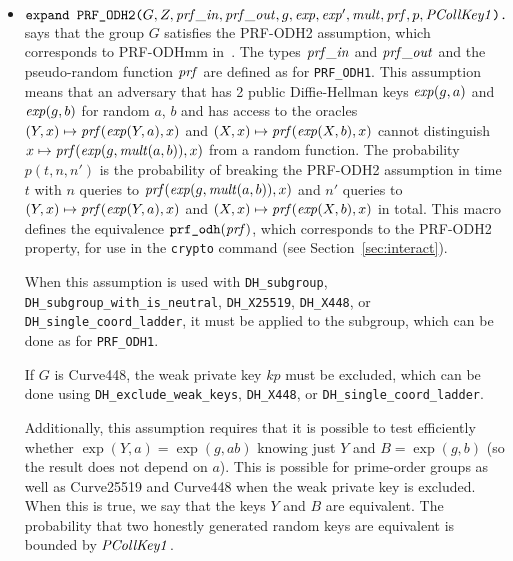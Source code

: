 \documentclass{article}
\begin{document}
\begin{itemize}
\begin{itemize}
\begin{itemize}
       \item $\texttt{expand\ PRF\_ODH2(}G, Z, \mathit{prf\_in}, \mathit{prf\_out}, g, \mathit{exp}, \mathit{exp}', \mathit{mult}, \mathit{prf}, p, \mathit{PCollKey1}\texttt{).}$ says that the group $G$ satisfies the PRF-ODH2 assumption, which corresponds to PRF-ODHmm in~\cite{eprint2017:517}.
       The types $\mathit{prf\_in}$ and $\mathit{prf\_out}$ and the pseudo-random function $\mathit{prf}$ are defined as for \texttt{PRF\_ODH1}.
       This assumption means that an adversary that has 2 public Diffie-Hellman keys $\mathit{exp}(g,a)$ and $\mathit{exp}(g,b)$ for random $a$, $b$ and has access to the oracles $(Y,x) \mapsto \mathit{prf}(\mathit{exp}(Y,a),x)$ and $(X,x) \mapsto \mathit{prf}(\mathit{exp}(X,b),x)$ cannot distinguish $x \mapsto \mathit{prf}(\mathit{exp}(g,\mathit{mult}(a,b)),x)$ from a random function.
The probability $p(t, n, n')$ is the probability of breaking the PRF-ODH2 assumption
   in time $t$ with $n$ queries to $\mathit{prf}(\mathit{exp}(g,\mathit{mult}(a,b)),x)$ and $n'$ queries to $(Y,x) \mapsto \mathit{prf}(\mathit{exp}(Y,a),x)$ and $(X,x) \mapsto \mathit{prf}(\mathit{exp}(X,b),x)$ in total.
This macro defines the equivalence
       $\texttt{prf\_odh}(\mathit{prf})$, which corresponds to the PRF-ODH2 property, for use in the \texttt{crypto} command (see
Section~\ref{sec:interact}).

When this assumption is used with \texttt{DH\_subgroup}, \texttt{DH\_subgroup\_with\_is\_neutral}, \texttt{DH\_X25519},
\texttt{DH\_X448}, or \texttt{DH\_single\_coord\_ladder}, it
must be applied to the subgroup, which can be done as for \texttt{PRF\_ODH1}.

If $G$ is Curve448, the weak private key $kp$ must be excluded,
which can be done using \texttt{DH\_exclude\_weak\_keys}, \texttt{DH\_X448},
or \texttt{DH\_single\_coord\_ladder}.

Additionally, this assumption requires that it is possible to test
efficiently whether $\exp(Y,a) = \exp(g, ab)$ knowing just $Y$ and
$B = \exp(g,b)$ (so the result does not depend on $a$). This is possible
for prime-order groups as well as Curve25519 and Curve448 when
the weak private key is excluded. When this is true,
we say that the keys $Y$ and $B$ are equivalent.
The probability that two honestly generated random keys are equivalent
is bounded by $\mathit{PCollKey1}$.


\end{itemize}
\end{itemize}
\end{itemize}
\end{document}
